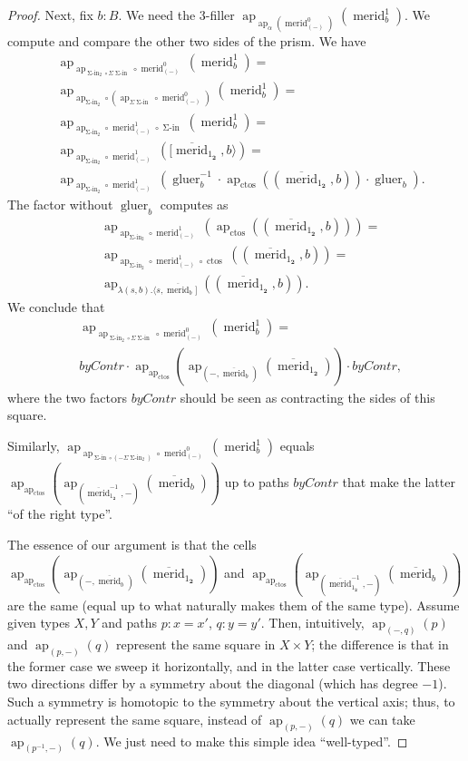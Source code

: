 \documentclass{amsart}
\theoremstyle{definition}
\newcommand{\ap}{\operatorname{ap}}
\newcommand{\gluer}{\operatorname{gluer}}
\newcommand{\merid}{\operatorname{merid}}
\newcommand{\mmerid}{\overline{{\operatorname{merid}}}}
\newcommand{\siin}{\operatorname{\Sigma-in}}
\newcommand{\s}{\mathbf{2}}
\newcommand{\ctos}{\operatorname{ctos}}
\begin{document}
\begin{proof}
Next, fix $b:B$. We need the 3-filler $\ap_{\ap_{\alpha}(\merid^0_{(-)})}(\merid^1_b)$. We compute and compare the other two sides of the prism. We have
\begin{align*}
& \ap_{\ap_{\siin_2 \circ \Sigma \siin} \circ \merid^0_{(-)}} (\merid^1_b) = \\
& \ap_{\ap_{\siin_2} \circ (\ap_{\Sigma \siin} \circ \merid^0_{(-)})} (\merid^1_b)  = \\
& \ap_{\ap_{\siin_2} \circ {\merid^1_{(-)}  \circ \siin}} (\merid^1_b)  = \\
& \ap_{\ap_{\siin_2} \circ {\merid^1_{(-)}}} ([\mmerid_{1_{\s}}, b \rangle ) = \\
& \ap_{\ap_{\siin_2} \circ {\merid^1_{(-)}}} (\gluer_b^{-1} \cdot {\ap_{\ctos}}((\mmerid_{1_{\s}}, b)) \cdot \gluer_b).
\end{align*}
The factor without $\gluer_b$ computes as
\begin{align*}
& \ap_{\ap_{\siin_2} \circ {\merid^1_{(-)}}} ({\ap_{\ctos}}((\mmerid_{1_{\s}}, b ))) = \\
& \ap_{\ap_{\siin_2} \circ {\merid^1_{(-)}} \circ {\ctos}}((\mmerid_{1_{\s}}, b )) = \\
& \ap_{\lambda(s,b).\langle s, \mmerid_b]}((\mmerid_{1_{\s}}, b )).
\end{align*}
We conclude that
\begin{align*}
& \ap_{\ap_{\siin_2 \circ \Sigma \siin} \circ \merid^0_{(-)}} (\merid^1_b) = \\
& byContr \cdot \ap_{\ap_{\ctos}}(\ap_{(-, \mmerid_b)}(\mmerid_{1_{\s}})) \cdot byContr,
\end{align*}
where the two factors $byContr$ should be seen as contracting the sides of this square.


Similarly, $\ap_{\ap_{\siin \circ (-\Sigma \siin_2)} \circ \merid^0_{(-)}} (\merid^1_b)$ equals $
\ap_{\ap_{\ctos}}(\ap_{(\mmerid_{1_{\s}}^{-1}, -)}(\mmerid_b))$ up to paths $byContr$ that make the latter ``of the right type''.

The essence of our argument is that the cells $\ap_{\ap_{\ctos}}(\ap_{(-, \mmerid_b)}(\mmerid_{1_{\s}}))$ and $\ap_{\ap_{\ctos}}(\ap_{(\mmerid_{1_{\s}}^{-1}, -)}(\mmerid_b))$ are the same (equal up to what naturally makes them of the same type). Assume given types $X, Y$ and paths $p: x = x'$, $q: y = y'$. Then, intuitively, $\ap_{(-, q)}(p)$ and $\ap_{(p, -)}(q)$ represent the same square in $X \times Y$; the difference is that in the former case we sweep it horizontally, and in the latter case vertically. These two directions differ by a symmetry about the diagonal (which has degree $-1$). Such a symmetry is homotopic to the symmetry about the vertical axis; thus, to actually represent the same square, instead of $\ap_{(p, -)}(q)$ we can take $\ap_{(p^{-1}, -)}(q)$. We just need to make this simple idea ``well-typed''.


\end{proof}
\end{document}
